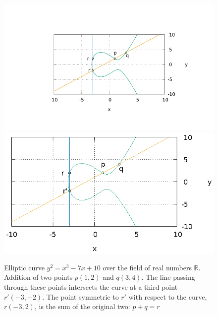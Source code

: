 \begin{figure}
\centering
\ifpdf
\includegraphics[angle=0,scale=1.5]
{./elliptic/picellipticsum.pdf}
\else
\includegraphics[angle=0,scale=1.5]
{./elliptic/picellipticsum.eps}
\fi
\caption{Elliptic curve $y^2 = x^3 -7 x + 10$ over the field of real numbers $\mathbb{R}$. Addition of two points $p(1,2)$ and $q(3,4)$. The line passing through these points intersects the curve at a third point $r'(-3,-2)$. The point symmetric to $r'$ with respect to the curve, $r(-3,2)$, is the sum of the original two: $p + q = r$}
\label{fig:add:ellipticRsum}
\end{figure}

